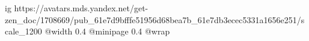  
 
 
 
 

\ifcmt
  ig https://avatars.mds.yandex.net/get-zen_doc/1708669/pub_61e7d9bfffe51956d68bea7b_61e7db3ecec5331a1656e251/scale_1200
  @width 0.4
  @minipage 0.4
  @wrap \parpic[r]
\fi
